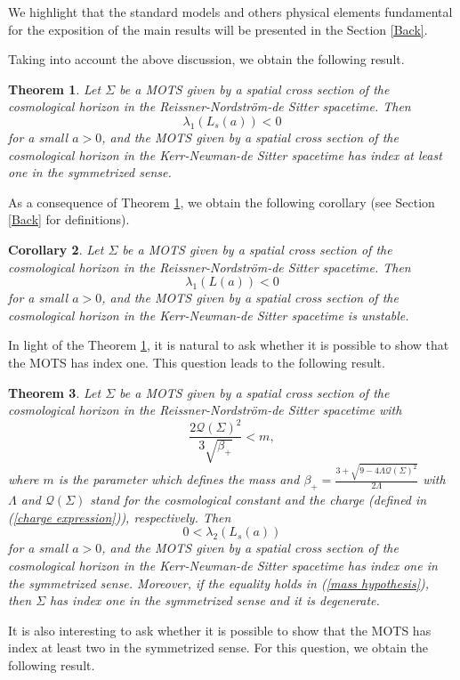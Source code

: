 \documentclass[a4paper, 11pt, reqno]{amsart}
\newtheorem{theo}{Theorem}[]
\newtheorem{coro}[theo]{Corollary}
\begin{document}
We highlight that the standard models and others physical elements fundamental for the exposition of the main results will be presented in the Section \ref{Back}. 

Taking into account the above discussion, we obtain the following result.




\begin{theo}\label{index least one}
Let $\Sigma$ be a MOTS given by a spatial cross section of the cosmological horizon in the Reissner-Nordström-de Sitter spacetime. Then
\begin{equation*}
    \lambda_1(L_s(a))<0
\end{equation*}
for a small $a>0$, and the MOTS given by a spatial cross section of the cosmological horizon in the Kerr-Newman-de Sitter spacetime has index at least one in the symmetrized sense. 
\end{theo}
As a consequence of Theorem \ref{index least one}, we obtain the following corollary (see Section \ref{Back} for definitions).
\begin{coro}\label{cor-1}
Let $\Sigma$ be a MOTS given by a spatial cross section of the cosmological horizon in the Reissner-Nordström-de Sitter spacetime. Then
\begin{equation*}
    \lambda_1(L(a))<0
\end{equation*}
for a small $a>0$, and the MOTS given by a spatial cross section of the cosmological horizon in the Kerr-Newman-de Sitter spacetime is unstable. 
\end{coro}
In light of the Theorem \ref{index least one}, it is natural to ask whether it is possible to show that the MOTS has index one. This question leads to the following result.
\begin{theo}\label{Theorem index one}
Let $\Sigma$ be a MOTS given by a spatial cross section of the cosmological horizon in the Reissner-Nordström-de Sitter spacetime
with
\begin{equation}\label{mass hypothesis}
         \frac{2\mathcal{Q}(\Sigma)^2}{3\sqrt{\beta_+}}< m,
     \end{equation}
   where $m$ is the parameter which defines the mass and  $\beta_+=\frac{3+\sqrt{9-4\Lambda\mathcal{Q}(\Sigma)^2}}{2\Lambda}$ with $\Lambda$ and $\mathcal{Q}(\Sigma)$ stand for the cosmological constant and the charge (defined in (\ref{charge expression})), respectively.
Then
\begin{equation*}
    0<\lambda_2(L_s(a)) 
\end{equation*}
for a small $a>0$, and the MOTS given by a spatial cross section of the cosmological horizon in the Kerr-Newman-de Sitter spacetime has index one in the symmetrized sense. Moreover, if the equality holds in (\ref{mass hypothesis}), then  $\Sigma$ has index one in the symmetrized sense and it is degenerate.
\end{theo}
It is also interesting to ask whether it is possible to show that the MOTS has index at least two in the symmetrized sense. For this question, we obtain the following result.
\end{document}
